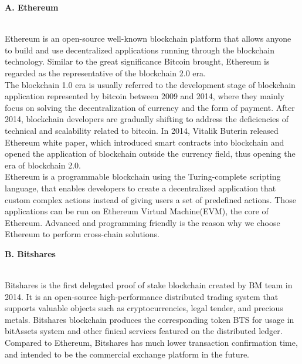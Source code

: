 \begin{large}
\noindent \textbf{A. Ethereum}
\end{large}\\

\noindent Ethereum\cite{wood2014ethereum} is an open-source well-known blockchain platform that allows anyone to build and use decentralized applications running through the blockchain technology. Similar to the great significance Bitcoin brought, Ethereum is regarded as the representative of the blockchain 2.0 era. \\

 \noindent The blockchain 1.0 era is usually referred to the development stage of blockchain application represented by bitcoin between 2009 and 2014, where they mainly focus on solving the decentralization of currency and the form of payment. After 2014, blockchain developers are gradually shifting to address the deficiencies of technical and scalability related to bitcoin. In 2014, Vitalik Buterin released Ethereum white paper\cite{buterin2014next}, which introduced smart contracts into blockchain and opened the application of blockchain outside the currency field, thus opening the era of blockchain 2.0.\\
 
 \noindent Ethereum is a programmable blockchain using the Turing-complete scripting language, that enables developers to create a decentralized application that custom complex actions instead of giving users a set of predefined actions. Those applications can be run on Ethereum Virtual Machine(EVM), the core of Ethereum. Advanced and programming friendly is the reason why we choose Ethereum to perform cross-chain solutions.\\
 
\begin{large}
\noindent \textbf{B. Bitshares}
\end{large}\\

\noindent Bitshares\cite{btsintro} is the first delegated proof of stake blockchain created by BM team in 2014. It is an open-source high-performance distributed trading system that supports valuable objects such as cryptocurrencies, legal tender, and precious metals\cite{larimer2013bitshares}. Bitshares blockchain produces the corresponding token BTS for usage in bitAssets system and other finical services featured on the distributed ledger. Compared to Ethereum, Bitshares has much lower transaction confirmation time, and intended to be the commercial exchange platform in the future.\\

